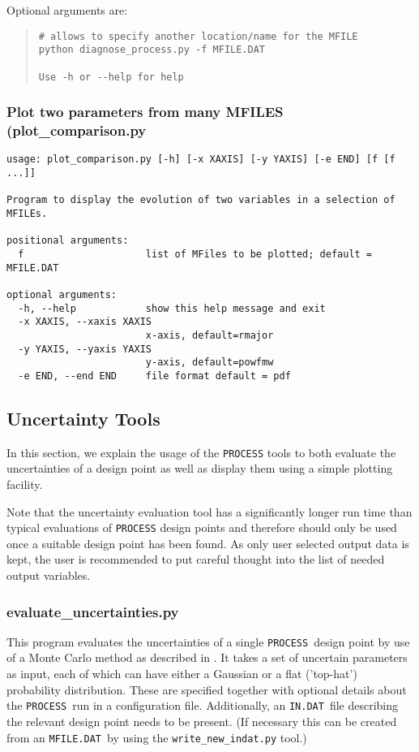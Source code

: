 \documentclass[11pt,a4paper]{article}
\newcommand{\indat}{\mbox{\texttt{IN.DAT}}}
\newcommand{\mfile}{\mbox{\texttt{MFILE.DAT}}}
\newcommand{\process}{\mbox{\texttt{PROCESS}}}
\begin{document}
Optional arguments are:
\begin{quote}
\begin{verbatim}
# allows to specify another location/name for the MFILE
python diagnose_process.py -f MFILE.DAT

Use -h or --help for help

\end{verbatim}
\end{quote}


\subsubsection{Plot two parameters from many MFILES (plot\_comparison.py}

\begin{verbatim}
usage: plot_comparison.py [-h] [-x XAXIS] [-y YAXIS] [-e END] [f [f ...]]

Program to display the evolution of two variables in a selection of MFILEs.

positional arguments:
  f                     list of MFiles to be plotted; default = MFILE.DAT

optional arguments:
  -h, --help            show this help message and exit
  -x XAXIS, --xaxis XAXIS
                        x-axis, default=rmajor
  -y YAXIS, --yaxis YAXIS
                        y-axis, default=powfmw
  -e END, --end END     file format default = pdf
\end{verbatim}

\subsection{Uncertainty Tools}

In this section, we explain the usage of the \process\/ tools to both evaluate
the uncertainties of a design point as well as display them using a simple
plotting facility.

Note that the uncertainty evaluation tool has a significantly longer run time
than typical evaluations of \process\/ design points and therefore should only
be used once a suitable design point has been found.  As only user selected
output data is kept, the user is recommended to put careful thought into the
list of needed output variables.

\subsubsection{evaluate\_uncertainties.py}
\label{subsec:evalunc}
This program evaluates the uncertainties of a single \process\ design point by
use of a Monte Carlo method as described in \cite{WPPMI2014Report}. It takes a
set of uncertain parameters as input, each of which can have either a Gaussian or a flat ('top-hat') probability distribution. These are specified together with optional details about the
\process\ run in a configuration file. Additionally, an \indat\ file
describing the relevant design point needs to be present. (If necessary this can be created
from an \mfile\ by using the \texttt{write\_new\_indat.py} tool.)
\end{document}
